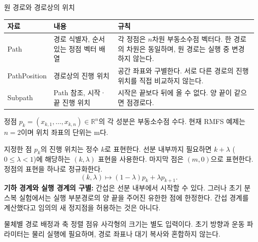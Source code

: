 \begin{frame}{원 경로와 경로상의 위치}
\footnotesize
\begin{tabular}{p{2.5cm}p{4.2cm}p{5.6cm}}\toprule
자료 & 내용 & 규칙\\\midrule
Path & 경로 식별자, 순서 있는 정점 벡터 배열 & 각 정점은 $n$차원 부동소수점 벡터다. 한 경로의 차원은 동일하며, 원 경로는 실행 중 변경하지 않는다.\\
PathPosition & 경로상의 진행 위치 & 공간 좌표와 구별한다. 서로 다른 경로의 진행 위치를 직접 비교하지 않는다.\\
Subpath & Path 참조, 시작·끝 진행 위치 & 시작은 끝보다 뒤에 올 수 없다. 양 끝이 같으면 점경로다.\\\bottomrule
\end{tabular}
\par\medskip
정점 $p_k=(x_{k,1},\ldots,x_{k,n})\in\mathbb R^n$의 각 성분은 부동소수점 수다.
현재 RMFS 예제는 $n=2$이며 위치 좌표의 단위는 m다.
\par\smallskip
지정한 점 $p_k$의 진행 위치는 정수 $k$로 표현한다. 선분 내부까지 필요하면
$k+\lambda$ ($0\le\lambda<1$)에 해당하는 $(k,\lambda)$ 표현을 사용한다.
마지막 점은 $(m,0)$으로 표현한다. 정점의 표현을 하나로 정규화한다.
\[
 (k,\lambda)\longmapsto (1-\lambda)p_k+\lambda p_{k+1}.
\]
\textbf{기하 경계와 실행 경계의 구별:}
간섭은 선분 내부에서 시작할 수 있다. 그러나 초기 분스복 실험에서는
실행 부분경로의 양 끝을 주어진 유한한 점에 한정한다.
간섭 경계를 계산했다고 임의의 새 정지점을 허용하는 것은 아니다.
\par\medskip\footnotesize
물체별 경로 배정과 축 정렬 점유 사각형의 크기는 별도 입력이다.
초기 방향과 운동 파라미터는 물리 실행에 필요하며, 경로 좌표나 대기 복사와 혼합하지 않는다.
\end{frame}

